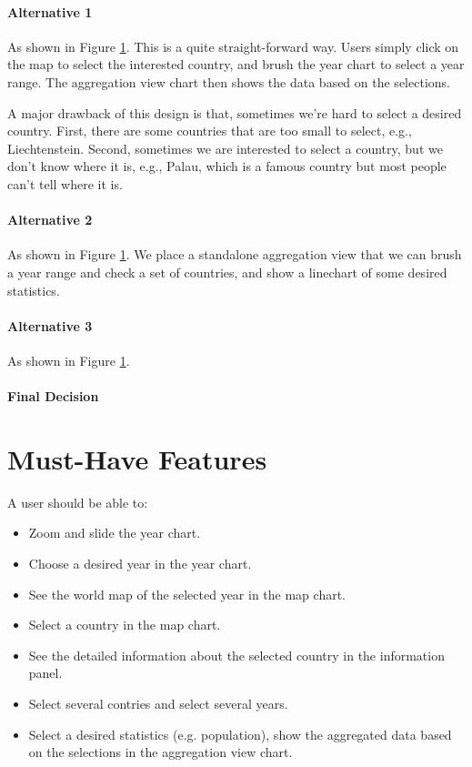 \documentclass[12pt, fullpage,letterpaper]{article}
\begin{document}
\paragraph{Alternative 1}
As shown in Figure \ref{}. 
This is a quite straight-forward way.
Users simply click on the map to select the interested country,
and brush the year chart to select a year range.
The aggregation view chart then shows the data based on the selections.

A major drawback of this design is that, sometimes we're hard to select a desired country.
First, there are some countries that are too small to select, e.g., Liechtenstein. Second, sometimes we are interested to select
a country, but we don't know where it is, e.g., Palau, which is a famous country but most people can't tell where it is.

\paragraph{Alternative 2}
As shown in Figure \ref{}.
We place a standalone aggregation view that we can brush a year range and check a set of countries, and
show a linechart of some desired statistics.

\paragraph{Alternative 3}
As shown in Figure \ref{}.

\paragraph{Final Decision}




\section{Must-Have Features}
A user should be able to:
\begin{itemize}
    \item Zoom and slide the year chart.
    \item Choose a desired year in the year chart. 
    \item See the world map of the selected year in the map chart.
    \item Select a country in the map chart.
    \item See the detailed information about the selected country in the information panel.
    \item Select several contries and select several years.
    \item Select a desired statistics (e.g. population), show the aggregated data based on the selections in the aggregation view chart.
\end{itemize}
\end{document}
